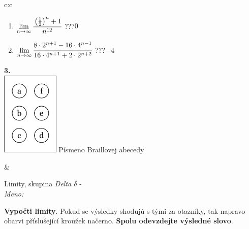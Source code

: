 \documentclass[10pt]{report}
\begin{document}
\begin{tabular}{c:c}
\begin{minipage}[c][104.5mm][t]{0.5\linewidth}
\begin{center}
\begin{minipage}{0.79\linewidth}
\begin{center}
\begin{varwidth}{\linewidth}
\begin{enumerate}
\item $\lim\limits_{n\to\infty}\cfrac{\left(\frac{1}{2}\right)^n +1}{n^{12}}$\quad \dotfill\; ???\;\dotfill \quad $0$
\item $\lim\limits_{n\to\infty}\cfrac{8\cdot 2^{n+1}-16\cdot 4^{n-1}}{16\cdot 4^{n+1}+2\cdot 2^{n+2}}$\quad \dotfill\; ???\;\dotfill \quad $-4$
\end{enumerate}
\end{varwidth}
\end{center}
\end{minipage}
\begin{minipage}{0.20\linewidth}
\begin{center}
{\Huge\bfseries 3.} \\[2mm]
\includegraphics[height=40mm]{../images/braille.png}
{\small Písmeno Braillovej abecedy}
\end{center}
\end{minipage}
\end{center}
\end{minipage}
&
\begin{minipage}[c][104.5mm][t]{0.5\linewidth}
\begin{center}
\vspace{7mm}
{\huge Limity, skupina \textit{Delta $\delta$} -}\\[5mm]
\textit{Meno:}\phantom{xxxxxxxxxxxxxxxxxxxxxxxxxxxxxxxxxxxxxxxxxxxxxxxxxxxxxxxxxxxxxxxxx}\\[5mm]
\begin{minipage}{0.95\linewidth}
\begin{center}
\textbf{Vypočti limity}. Pokud se výsledky shodujú s tými za otazníky, tak napravo\\obarvi příslušející kroužek načerno. \textbf{Spolu odevzdejte výsledné slovo}.
\end{center}
\end{minipage}
\\[1mm]
\begin{minipage}{0.79\linewidth}
\begin{center}
\begin{varwidth}{\linewidth}

\end{varwidth}
\end{center}
\end{minipage}
\end{center}
\end{minipage}
\end{tabular}
\end{document}
